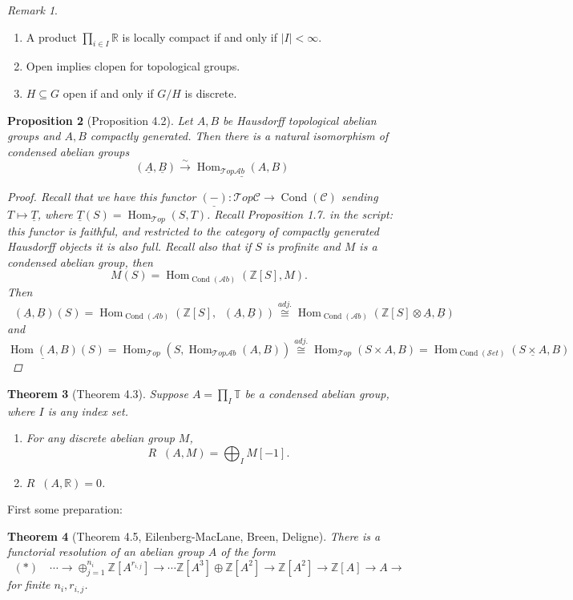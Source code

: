 \documentclass[12pt]{article}
\theoremstyle{darkgreentheorem}
\newtheorem{thm}{Theorem}[section]
\newtheorem{prop}[thm]{Proposition}
\theoremstyle{darkbluedefinition}
\theoremstyle{darkredexample}
\theoremstyle{remark}
\newtheorem{rem}[thm]{Remark}
\newcommand{\Z}{\mathbb{Z}}
\newcommand{\R}{\mathbb{R}}
\newcommand{\1}{\mathbbm{1}}
\newcommand{\bbT}{\mathbb{T}}
\newcommand{\scrC}{\mathscr{C}}
\newcommand{\Top}{\mathscr{T}op}
\newcommand{\Ab}{\mathscr{A}b}
\newcommand{\Set}{\mathscr{S}et}
\DeclareMathOperator{\Hom}{Hom}
\DeclareMathOperator{\Cond}{Cond}
\DeclareMathOperator{\ihom}{\underline{Hom}}
\renewcommand{\u}[1]{\underline{#1}}
\newcommand{\ot}{\otimes}
\newcommand{\op}{\oplus}
\newcommand{\tms}{\times}
\newcommand{\sub}{\subseteq}
\begin{document}
\begin{rem}
    \begin{enumerate}[label=\roman*)]
	\item A product $\prod_{i\in I}\R$ is locally compact if and only if $|I|<\infty$.
	\item Open implies clopen for topological groups.
	\item $H\sub G$ open if and only if $G/H$ is discrete.
    \end{enumerate}
\end{rem}

\begin{prop}[Proposition 4.2]
    Let $A,B$ be Hausdorff topological abelian groups and $A,B$ compactly generated.
    Then there is a natural isomorphism of condensed abelian groups
    \[ \ihom(\u{A},\u{B})\xrightarrow{\sim} \u{\Hom_{\Top\Ab}(A,B)} \]
    \begin{proof}
	Recall that we have this functor $\u{(-)}\colon \Top\scrC\to \Cond(\scrC)$ sending $T\mapsto \u{T}$, where $\u{T}(S)=\Hom_{\Top}(S,T)$.
	Recall Proposition 1.7. in the script: this functor is faithful, and restricted to the category of compactly generated Hausdorff objects it is also full.
	Recall also that if $S$ is profinite and $M$ is a condensed abelian group, then
	\[ M(S)=\Hom_{\Cond(\Ab)}(\Z[S],M). \]
	Then
	\[ \ihom(\u{A},\u{B})(S)=\Hom_{\Cond(\Ab)}(\Z[S],\ihom(\u{A},\u{B}))\overset{adj.}{\cong} \Hom_{\Cond(\Ab)}(\Z[S]\ot \u{A}, \u{B}) \]
	and
	\[ \u{\Hom(A,B)}(S)=\Hom_{\Top}(S,\Hom_{\Top\Ab}(A,B))\overset{adj.}{\cong} \Hom_{\Top}(S\tms A,B)=\Hom_{\Cond(\Set)}(\u{S\tms A},B) \]
    \end{proof}
\end{prop}

\begin{thm}[Theorem 4.3]
    Suppose $A=\prod_{I}\bbT$ be a condensed abelian group, where $I$ is any index set.
    \begin{enumerate}[label=\roman*)]
	\item For any discrete abelian group $M$,
	    \[ R\ihom(A,M)=\bigoplus_{I}M[-1]. \]
	\item $R\ihom(A,\R)=0$.
    \end{enumerate}
\end{thm}

First some preparation:

\begin{thm}[Theorem 4.5, Eilenberg-MacLane, Breen, Deligne]
    There is a functorial resolution of an abelian group $A$ of the form
    \[ (*)\quad \cdots \to \op_{j=1}^{n_{i}}\Z[A^{r_{{i,j}}}]\to \cdots \Z[A^{3}]\op \Z[A^{2}]\to \Z[A^{2}]\to \Z[A]\to A\to \]
    for finite $n_{i},r_{i,j}$.
\end{thm}
\end{document}
